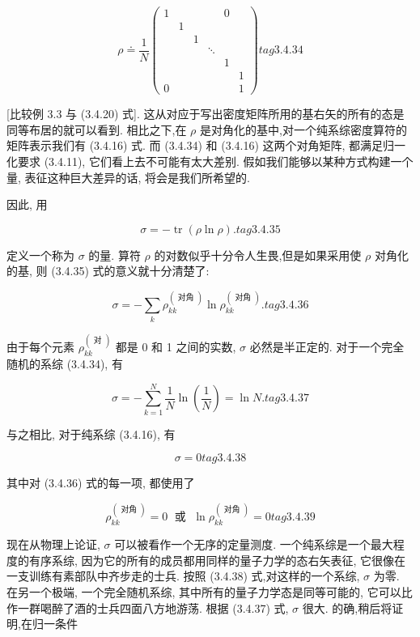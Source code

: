 $$
\rho \doteq \frac{1}{N}\left( \begin{array}{llllll} 1 & & & & 0 & \\ & 1 & & & & \\ & & 1 & & & \\ & & & \ddots & & \\ & & & & 1 & \\ & & & & & 1 \\ 0 & & & & & 1 \end{array}\right) tag{3. 4.34}
$$

[比较例 3.3 与 (3.4.20) 式]. 这从对应于写出密度矩阵所用的基右矢的所有的态是同等布居的就可以看到. 相比之下,在 $\rho$ 是对角化的基中,对一个纯系综密度算符的矩阵表示我们有 (3.4.16) 式. 而 (3.4.34) 和 (3.4.16) 这两个对角矩阵, 都满足归一化要求 (3.4.11), 它们看上去不可能有太大差别. 假如我们能够以某种方式构建一个量, 表征这种巨大差异的话, 将会是我们所希望的.

因此, 用

$$
\sigma = - \operatorname{tr}\left( {\rho \ln \rho }\right) . tag{3. 4.35}
$$

定义一个称为 $\sigma$ 的量. 算符 $\rho$ 的对数似乎十分令人生畏,但是如果采用使 $\rho$ 对角化的基, 则 (3.4.35) 式的意义就十分清楚了:

$$
\sigma = - \mathop{\sum }\limits_{k}{\rho }_{kk}^{\left( \text{ 对角 }\right) }\ln {\rho }_{kk}^{\left( \text{ 对角 }\right) }. tag{3. 4.36}
$$

由于每个元素 ${\rho }_{kk}^{\left( \text{ 对 }\right) }$ 都是 0 和 1 之间的实数, $\sigma$ 必然是半正定的. 对于一个完全随机的系综 (3.4.34), 有

$$
\sigma = - \mathop{\sum }\limits_{{k = 1}}^{N}\frac{1}{N}\ln \left( \frac{1}{N}\right) = \ln N. tag{3. 4.37}
$$

与之相比, 对于纯系综 (3.4.16), 有

$$
\sigma = 0 tag{3. 4.38}
$$

其中对 (3.4.36) 式的每一项, 都使用了

$$
{\rho }_{kk}^{\left( \text{ 对角 }\right) } = 0\;\text{ 或 }\;\ln {\rho }_{kk}^{\left( \text{ 对角 }\right) } = 0 tag{3. 4.39}
$$

现在从物理上论证, $\sigma$ 可以被看作一个无序的定量测度. 一个纯系综是一个最大程度的有序系综, 因为它的所有的成员都用同样的量子力学的态右矢表征, 它很像在一支训练有素部队中齐步走的士兵. 按照 (3.4.38) 式,对这样的一个系综, $\sigma$ 为零. 在另一个极端, 一个完全随机系综, 其中所有的量子力学态是同等可能的, 它可以比作一群喝醉了酒的士兵四面八方地游荡. 根据 (3.4.37) 式, $\sigma$ 很大. 的确,稍后将证明,在归一条件

